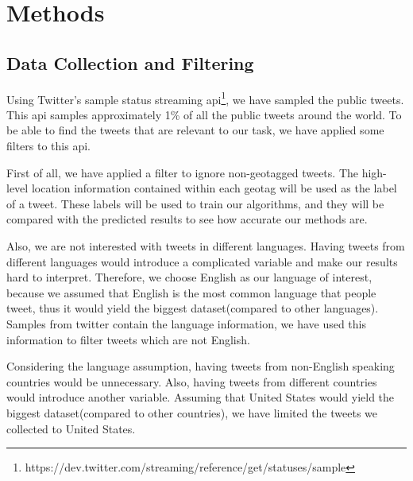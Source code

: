 \documentclass[twoside,11pt]{article}
\begin{document}


\section{Methods}

\subsection{Data Collection and Filtering}

Using Twitter's sample status streaming api\footnote{https://dev.twitter.com/streaming/reference/get/statuses/sample}, we have sampled the public tweets. This api samples approximately 1\% of all the public tweets around the world. To be able to find the tweets that are relevant to our task, we have applied some filters to this api. 

First of all, we have applied a filter to ignore non-geotagged tweets. The high-level location information contained within each geotag will be used as the label of a tweet. These labels will be used to train our algorithms, and they will be compared with the predicted results to see how accurate our methods are.

Also, we are not interested with tweets in different languages. Having tweets from different languages would introduce a complicated variable and make our results hard to interpret. Therefore, we choose English as our language of interest, because we assumed that English is the most common language that people tweet, thus it would yield the biggest dataset(compared to other languages). Samples from twitter contain the language information, we have used this information to filter tweets which are not English. 

Considering the language assumption, having tweets from non-English speaking countries would be unnecessary. Also, having tweets from different countries would introduce another variable. Assuming that United States would yield the biggest dataset(compared to other countries), we have limited the tweets we collected to United States.
\end{document}
